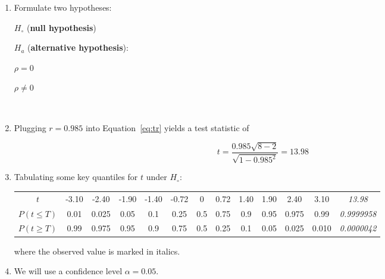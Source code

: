 \begin{enumerate}
\item Formulate two hypotheses:

  \noindent\begin{minipage}{.4\textwidth}
  $H_\circ$ (\textbf{null hypothesis})
  
  \vspace{1em}
  
  $H_a$ (\textbf{alternative hypothesis}):
\end{minipage}
\begin{minipage}{.2\textwidth}
\end{minipage}
\begin{minipage}{.2\textwidth}
  $\rho=0$
  
  \vspace{1em}
  
  $\rho\neq{0}$
\end{minipage}
\begin{minipage}{.2\textwidth}
\end{minipage}\\

\item Plugging $r = 0.985$ into Equation~\ref{eq:tr} yields a test
  statistic of

  \[
  t = \frac{0.985\sqrt{8-2}}{\sqrt{1-0.985^2}} = 13.98
  \]

\item Tabulating some key quantiles for $t$ under $H_\circ$:

  \begin{center}
    \begin{tabular}{c|c@{\gap}c@{\gap}c@{\gap}c@{\gap}
        c@{\gap}c@{\gap}c@{\gap}c@{\gap}c@{\gap}c@{\gap}c@{\gap}c}
      $t$ & -3.10 & -2.40 & -1.90 & -1.40 & -0.72 &
      0 & 0.72 & 1.40 & 1.90 & 2.40 & 3.10 & \emph{13.98}\\
      $P(t\leq{T})$ & 0.01 & 0.025 & 0.05 & 0.1 & 0.25 &
      0.5 & 0.75 & 0.9 & 0.95 & 0.975 & 0.99 & \emph{0.9999958}\\
      $P(t\geq{T})$ & 0.99 & 0.975 & 0.95 & 0.9 & 0.75 & 0.5 &
      0.25 & 0.1 & 0.05 & 0.025 & 0.010 & \emph{0.0000042}
    \end{tabular}
  \end{center}

  \noindent where the observed value is marked in italics.
  
\item We will use a confidence level $\alpha = 0.05$.


\end{enumerate}
